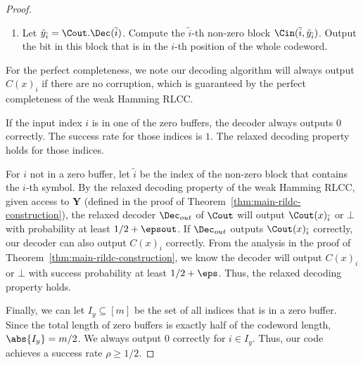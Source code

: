 \begin{proof}
\begin{enumerate}
\begin{enumerate}
		\item Answer $\Cout.\Dec(i)$ with bit $\tildey_j$ and await the next query.
	\end{enumerate}
	
	\item Let $\tilde{y}_{\tilde{i}} = \Cout.\Dec(\tilde{i})$. Compute the $\tilde{i}$-th non-zero block $\Cin(\tilde{i}, \tilde{y}_{\tilde{i}})$. Output the bit in this block that is in the $i$-th position of the whole codeword. 
\end{enumerate}

For the perfect completeness, we note our decoding algorithm will always output $C(x)_i$ if there are no corruption, which is guaranteed by the perfect completeness of the weak Hamming RLCC. 


If the input index $i$ is in one of the zero buffers, the decoder always outputs $0$ correctly. The success rate for those indices is $1$. The relaxed decoding property holds for those indices. 

For $i$ not in a zero buffer, let $\tilde{i}$ be the index of the non-zero block that contains the $i$-th symbol. By the relaxed decoding property of the weak Hamming RLCC, given access to $\mathbf{Y}$ (defined in the proof of Theorem~\ref{thm:main-rildc-construction}), the relaxed decoder $\Dec_{out}$ of $\Cout$ will output $\Cout(x)_{\tilde{i}}$ or $\bot$ with probability at least $1/2+\epsout$. If $\Dec_{out}$ outputs $\Cout(x)_{\tilde{i}}$ correctly, our decoder can also output $C(x)_i$ correctly. From the analysis in the proof of Theorem~\ref{thm:main-rildc-construction}, we know the decoder will output $C(x)_i$ or $\bot$ with success probability at least $1/2 + \eps$. Thus, the relaxed decoding property holds.



Finally, we can let $I_y \subseteq [m]$ be the set of all indices that is in a zero buffer. Since the total length of zero buffers is exactly half of the codeword length, $\abs{I_y} = m/2$. We always output 0 correctly for $i\in I_y$. Thus, our code achieves a success rate $\rho \ge 1/2$.
\end{proof}

